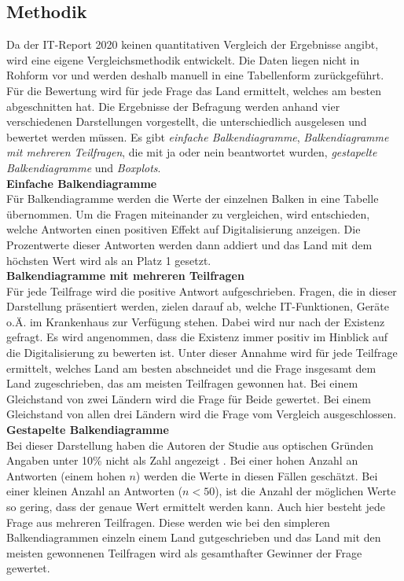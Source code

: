 \subsection{Methodik}
	Da der IT-Report 2020 keinen quantitativen Vergleich der Ergebnisse angibt, wird eine eigene Vergleichsmethodik entwickelt. Die Daten liegen nicht in Rohform vor und werden deshalb manuell in eine Tabellenform zurückgeführt. Für die Bewertung wird für jede Frage das Land ermittelt, welches am besten abgeschnitten hat. Die Ergebnisse der Befragung werden anhand vier verschiedenen Darstellungen vorgestellt, die unterschiedlich ausgelesen und bewertet werden müssen. Es gibt \textit{einfache Balkendiagramme}, \textit{Balkendiagramme mit mehreren Teilfragen}, die mit ja oder nein beantwortet wurden, \textit{gestapelte Balkendiagramme} und \textit{Boxplots}.
	\vspace{\parheadvspace}\\
	\textbf{Einfache Balkendiagramme}\\
	Für Balkendiagramme werden die Werte der einzelnen Balken in eine Tabelle übernommen. Um die Fragen miteinander zu vergleichen, wird entschieden, welche Antworten einen positiven Effekt auf Digitalisierung anzeigen. Die Prozentwerte dieser Antworten werden dann addiert und das Land mit dem höchsten Wert wird als an Platz 1 gesetzt.
	\vspace{\parheadvspace}\\
	\textbf{Balkendiagramme mit mehreren Teilfragen}\\
	Für jede Teilfrage wird die positive Antwort aufgeschrieben. Fragen, die in dieser Darstellung präsentiert werden, zielen darauf ab, welche IT-Funktionen, Geräte o.Ä. im Krankenhaus zur Verfügung stehen. Dabei wird nur nach der Existenz gefragt. Es wird angenommen, dass die Existenz immer positiv im Hinblick auf die Digitalisierung zu bewerten ist. Unter dieser Annahme wird für jede Teilfrage ermittelt, welches Land am besten abschneidet und die Frage insgesamt dem Land zugeschrieben, das am meisten Teilfragen gewonnen hat. Bei einem Gleichstand von zwei Ländern wird die Frage für Beide gewertet. Bei einem Gleichstand von allen drei Ländern wird die Frage vom Vergleich ausgeschlossen.
	\vspace{\parheadvspace}\\
	\textbf{Gestapelte Balkendiagramme}\\
	Bei dieser Darstellung haben die Autoren der Studie aus optischen Gründen Angaben unter 10\% nicht als Zahl angezeigt \parencite[298]{huebner2020}. Bei einer hohen Anzahl an Antworten (einem hohen $n$) werden die Werte in diesen Fällen geschätzt. Bei einer kleinen Anzahl an Antworten ($n<50$), ist die Anzahl der möglichen Werte so gering, dass der genaue Wert ermittelt werden kann. Auch hier besteht jede Frage aus mehreren Teilfragen. Diese werden wie bei den simpleren Balkendiagrammen einzeln einem Land gutgeschrieben und das Land mit den meisten gewonnenen Teilfragen wird als gesamthafter Gewinner der Frage gewertet.\\

